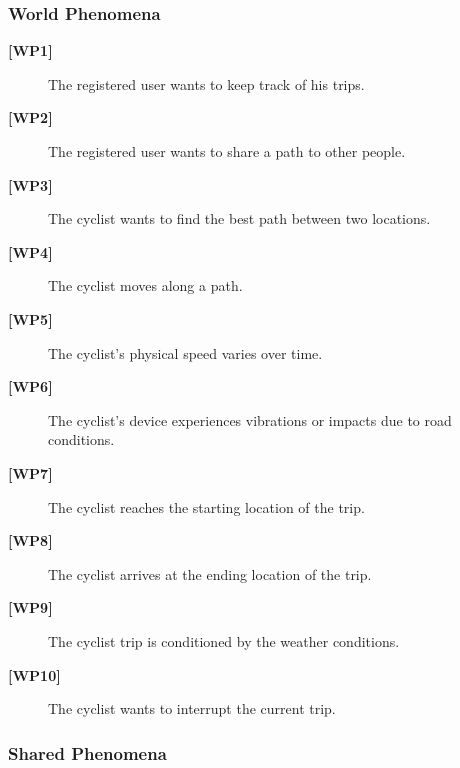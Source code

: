 \subsubsection{World Phenomena}
\begin{description}
    \item[\textbf{[WP1]}] The registered user wants to keep track of his trips.

    \item[\textbf{[WP2]}] The registered user wants to share a path to other people.

    \item[\textbf{[WP3]}] The cyclist wants to find the best path between two locations.
    
    \item[\textbf{[WP4]}] The cyclist moves along a path.
    
    \item[\textbf{[WP5]}] The cyclist’s physical speed varies over time.
    
    \item[\textbf{[WP6]}] The cyclist’s device experiences vibrations or impacts due to road conditions.
    
    \item[\textbf{[WP7]}] The cyclist reaches the starting location of the trip.
    
    \item[\textbf{[WP8]}] The cyclist arrives at the ending location of the trip.
    
    \item[\textbf{[WP9]}] The cyclist trip is conditioned by the weather conditions.

    \item[\textbf{[WP10]}] The cyclist wants to interrupt the current trip.
\end{description}

\subsubsection{Shared Phenomena}
